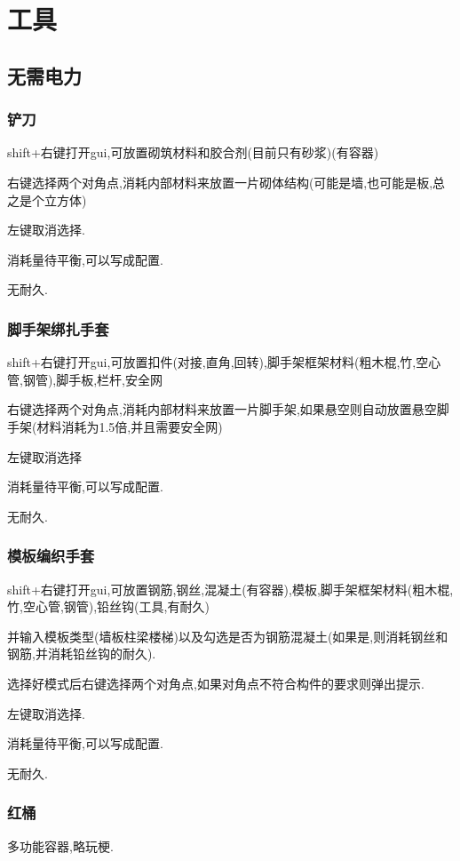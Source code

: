 \section{工具}{
  \subsection{无需电力}{

    \subsubsection{铲刀}{
      shift+右键打开gui,可放置砌筑材料和胶合剂(目前只有砂浆)(有容器)

      右键选择两个对角点,消耗内部材料来放置一片砌体结构(可能是墙,也可能是板,总之是个立方体)

      左键取消选择.

      消耗量待平衡,可以写成配置.

      无耐久.
    }\label{spatula}

    \subsubsection{脚手架绑扎手套}{
      shift+右键打开gui,可放置扣件(对接,直角,回转),脚手架框架材料(粗木棍,竹,空心管,钢管),脚手板,栏杆,安全网

      右键选择两个对角点,消耗内部材料来放置一片脚手架,如果悬空则自动放置悬空脚手架(材料消耗为1.5倍,并且需要安全网)

      左键取消选择

      消耗量待平衡,可以写成配置.

      无耐久.
    }

    \subsubsection{模板编织手套}{
      shift+右键打开gui,可放置钢筋,钢丝,混凝土(有容器),模板,脚手架框架材料(粗木棍,竹,空心管,钢管),铅丝钩(工具,有耐久)

      并输入模板类型(墙板柱梁楼梯)以及勾选是否为钢筋混凝土(如果是,则消耗钢丝和钢筋,并消耗铅丝钩的耐久).

      选择好模式后右键选择两个对角点,如果对角点不符合构件的要求则弹出提示.

      左键取消选择.

      消耗量待平衡,可以写成配置.

      无耐久.
    }

    \subsubsection{红桶}{
      多功能容器,略玩梗.

}}}
